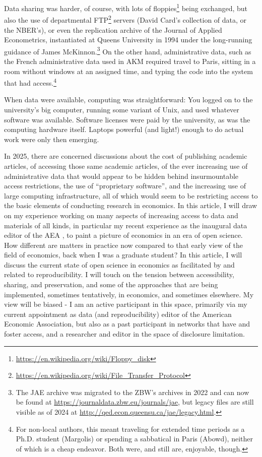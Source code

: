 \documentclass{article}
\begin{document}
Data sharing was harder, of course, with lots of floppies\footnote{\url{https://en.wikipedia.org/wiki/Floppy_disk}} being exchanged, but also the use of departmental FTP\footnote{\url{https://en.wikipedia.org/wiki/File_Transfer_Protocol}} servers (David Card's collection of data, or the NBER's), or even the replication archive of the Journal of Applied Econometrics, instantiated at Queens University in 1994 under the long-running guidance of James McKinnon.\footnote{The JAE archive was migrated to the ZBW's archives in 2022 and can now be found at \url{https://journaldata.zbw.eu/journals/jae}, but legacy files are still visible as of 2024 at \url{http://qed.econ.queensu.ca/jae/legacy.html}.} On the other hand, administrative data, such as the French administrative data used in AKM required travel to Paris, sitting in a room without windows at an assigned time, and typing the code into the system that had access.\footnote{For non-local authors, this meant traveling for extended time periods as a Ph.D. student (Margolis) or spending a sabbatical in Paris (Abowd), neither of which is a cheap endeavor. Both were, and still are, enjoyable, though.}

When data were available, computing was straightforward: You logged on to the university's big computer, running some variant of Unix, and used whatever software was available. Software licenses were paid by the university, as was the computing hardware itself. Laptops powerful (and light!) enough to do actual work were only then emerging. 

In 2025, there are concerned discussions about the cost of publishing academic articles, of accessing those same academic articles, of the ever increasing use of administrative data \citep{card_expanding_2010,card_expanding_2010-1,chetty_time_2012,einav_economics_2014} that would appear to be hidden behind insurmountable access restrictions,  the use of ``proprietary software'', and the increasing use of large computing infrastructure, all of which would seem to be restricting access to the basic elements of conducting research in economics. In this article, I will draw on my experience working on many aspects of increasing access to data and materials of all kinds, in particular my recent experience as the inaugural data editor of the \ac{AEA} \citep{10.1257/pandp.108.745}, to paint a picture of economics in an era of open science. How different are matters in practice now compared to that early view of the field of economics, back when I was a graduate student?
%
In this article, I will discuss the current state of open science in economics as facilitated by and related to reproducibility. I will touch on the tension between accessibility, sharing, and preservation, and some of the approaches that are being implemented, sometimes tentatively, in economics, and sometimes elsewhere. My view will be biased - I am an active participant in this space, primarily via my current appointment as data (and reproducibility) editor of the American Economic Association, but also as a past participant in networks that have and foster access, and a researcher and editor in the space of disclosure limitation.
\end{document}
